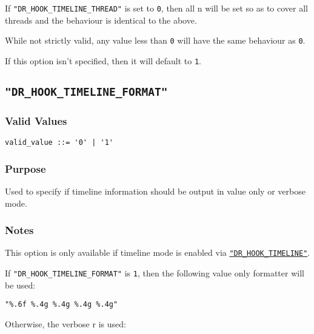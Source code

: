 If \texttt{"DR\_HOOK\_TIMELINE\_THREAD"} is set to \verb|0|, then all n will be set so as to cover all threads and the behaviour is identical to the above.

While not strictly valid, any value less than \verb|0| will have the same behaviour as \verb|0|.

If this option isn't specified, then it will default to \verb|1|.



\subsection{\texttt{"DR\_HOOK\_TIMELINE\_FORMAT"}}
\label{section:flags:DR_HOOK_TIMELINE_FORMAT}
\vspace{-2ex}
\subsubsection{Valid Values}
\vspace{-2ex}
\verb+valid_value ::= '0' | '1'+ 

\vspace{-2ex}
\subsubsection{Purpose}
\vspace{-2ex}
Used to specify if timeline information should be output in value only or verbose mode.

\vspace{-2ex}
\subsubsection{Notes}
\vspace{-2ex}
This option is only available if timeline mode is enabled via \hyperref[section:flags:DR_HOOK_TIMELINE]{\texttt{"DR\_HOOK\_TIMELINE"}}.

If \texttt{"DR\_HOOK\_TIMELINE\_FORMAT"} is \verb|1|, then the following value only formatter will be used:

\verb|"%.6f %.4g %.4g %.4g %.4g"|

Otherwise, the verbose r is used:

